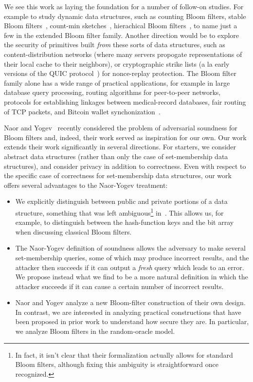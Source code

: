 We see this work as laying the foundation for a number of follow-on studies.  For example to study dynamic data structures, such as counting Bloom filters\cite{xxx}, stable Bloom filters~\cite{xxx}, count-min sketches~\cite{xxx}, hierachical Bloom filters~\cite{xxx}, to name just a few in the extended Bloom filter family.  Another direction would be to explore the security of primitives built \emph{from} these sorts of data structures, such as content-distribution networks (where many servers propogate representations of their local cache to their neighbors), or cryptographic strike lists (a la early versions of the QUIC protocol~\cite{xxx}) for nonce-replay protection.  The Bloom filter family alone has a wide range of practical applications, for example in large database query
processing, routing algorithms for peer-to-peer networks, protocols
for establishing linkages between medical-record databases, fair
routing of TCP packets, and Bitcoin wallet synchonization~\cite{schnell2011novel,niedermeyer2014cryptanalysis,gervais2014privacy,nojima2009cryptographically,feng2001stochastic,reynolds2003efficient,byers2002informed,broder2004network}.


 Naor and
Yogev~\cite{naor2015bloom} recently considered the problem of
adversarial soundness for Bloom filters and, indeed,
their work served as inspiration for our own. Our work extends
their work significantly in several directions. For starters, we
consider abstract data structures (rather than only the case of
set-membership data structures), and consider privacy in addition to
correctness. Even with respect to the specific case of correctness for
set-membership data structures, our work offers several advantages
to the Naor-Yogev treatment:
\begin{itemize}
\item We explicitly distinguish between public and private
    portions of a data structure, something that was left
    ambiguous\footnote{In fact, it isn't clear that their formalization actually allows for standard Bloom filters, although fixing this ambiguity is straightforward once recognized.} in~\cite{naor2015bloom}. This allows us, for
    example, to distinguish between the hash-function keys and
    the bit array when discussing classical Bloom filters.
\item The Naor-Yogev definition of soundness allows the
    adversary to make several set-membership queries, some of
    which may produce incorrect results, and the attacker then
    succeeds if it can output a \emph{fresh} query which leads
    to an error. We propose instead what we find to be a more
    natural definition in which the attacker succeeds if it can
    cause a certain number of incorrect results.
\item Naor and Yogev analyze a new Bloom-filter construction of
    their own design. In contrast, we are interested in
    analyzing practical constructions that have been proposed in
    prior work to understand how secure they are. In particular,
    we analyze Bloom filters in the random-oracle model.
\end{itemize}

